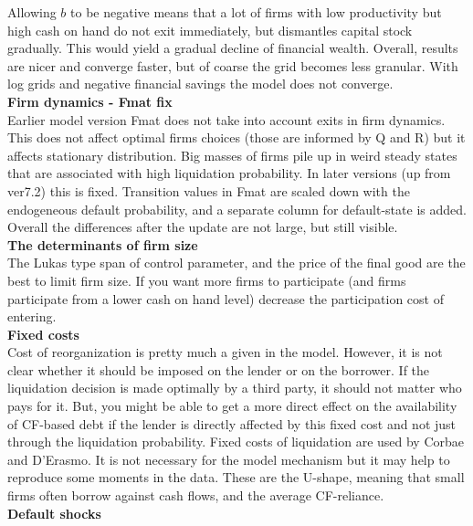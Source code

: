 \documentclass[12pt]{article}
\begin{document}
Allowing $b$ to be negative means that a lot of firms with low productivity but high cash on hand do not exit immediately, but dismantles capital stock gradually. This would yield a gradual decline of financial wealth. Overall, results are nicer and converge faster, but of coarse the grid becomes less granular. With log grids and negative financial savings the model does not converge.  \vspace{3mm} \\
\textbf{Firm dynamics - Fmat fix} \\ 
Earlier model version Fmat does not take into account exits in firm dynamics. This does not affect optimal firms choices (those are informed by Q and R) but it affects stationary distribution. Big masses of firms pile up in weird steady states that are associated with high liquidation probability. In later versions (up from ver7.2) this is fixed. Transition values in Fmat are scaled down with the endogeneous default probability, and a separate column for default-state is added. Overall the differences after the update are not large, but still visible. \vspace{3mm} \\
\textbf{The determinants of firm size} \\
 The Lukas type span of control parameter, and the price of the final good are the best to limit firm size. If you want more firms to participate (and firms participate from a lower cash on hand level) decrease the participation cost of entering. \vspace{3mm} \\
\textbf{Fixed costs} \\
Cost of reorganization is pretty much a given in the model. However, it is not clear whether it should be imposed on the lender or on the borrower. If the liquidation decision is made optimally by a third party, it should not matter who pays for it. But, you might be able to get a more direct effect on the  availability of CF-based debt if the lender is directly affected by this fixed cost and not just through the liquidation probability. Fixed costs of liquidation are used by Corbae and D'Erasmo. It is not necessary for the model mechanism but it may help to reproduce some moments in the data. These are the U-shape, meaning that small firms often borrow against cash flows, and the average CF-reliance. \vspace{3mm} \\
\textbf{Default shocks} \\
\end{document}
